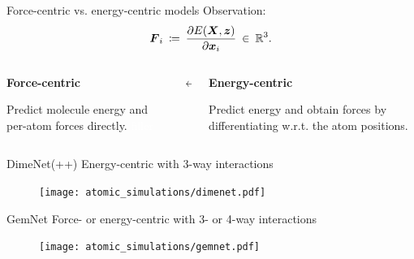 \begin{frame}{Force-centric vs. energy-centric models}
    Observation: 
    \[
        \boldsymbol{F}_i \: \coloneqq \: \frac{\partial E(\boldsymbol{X}, \boldsymbol{z})}{\partial \boldsymbol{x}_i} \: \in \: \mathbb{R}^3.
    \]
    \begin{columns}
        \centering
        \begin{column}{0.35\textwidth}
           \begin{center}
                \textbf{Force-centric}
           \end{center}
           Predict molecule energy and per-atom forces directly. \textcolor{white}{filler}
        \end{column}
        \begin{column}{0.15\textwidth}
            \begin{center}
                $\boldsymbol{\leftrightarrow}$
            \end{center}
        \end{column}
        \begin{column}{0.35\textwidth}
            \begin{center}
                \textbf{Energy-centric}
            \end{center}
            Predict energy and obtain forces by differentiating w.r.t. 
            the atom positions.
        \end{column}
    \end{columns}
\end{frame}

\begin{frame}{DimeNet(++) }
    \centering
    Energy-centric with 3-way interactions
    \begin{figure}[H]
        \vspace*{-1em}
        \texttt{[image: atomic\_simulations/dimenet.pdf]}
    \end{figure}
\end{frame}

\begin{frame}{GemNet }
    \centering
    Force- or energy-centric with 3- or 4-way interactions
    \begin{figure}[H]
        \vspace*{-1em}
        \texttt{[image: atomic\_simulations/gemnet.pdf]}
    \end{figure}
\end{frame}